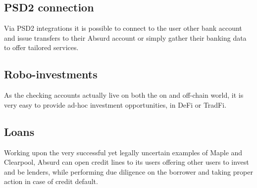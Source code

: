 \documentclass[a4paper,10 pt]{article}
\theoremstyle{definition}
\begin{document}
\subsection{PSD2 connection}
Via PSD2 integrations it is possible to connect to the user other bank account and issue transfers to their Absurd account or simply gather their banking data to offer tailored services.

\subsection{Robo-investments}
As the checking accounts actually live on both the on and off-chain world, it is very easy to provide ad-hoc investment opportunities, in DeFi or TradFi.

\subsection{Loans}
Working upon the very successful yet legally uncertain examples of Maple and Clearpool, Absurd can open credit lines to its users offering other users to invest and be lenders, while performing due diligence on the borrower and taking proper action in case of credit default.
\end{document}
